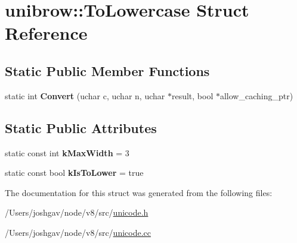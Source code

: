\hypertarget{structunibrow_1_1_to_lowercase}{}\section{unibrow\+:\+:To\+Lowercase Struct Reference}
\label{structunibrow_1_1_to_lowercase}
\subsection*{Static Public Member Functions}
\begin{DoxyCompactItemize}
\item 
static int {\bfseries Convert} (uchar c, uchar n, uchar $\ast$result, bool $\ast$allow\+\_\+caching\+\_\+ptr)\hypertarget{structunibrow_1_1_to_lowercase_a3dee260f86f4c06840bd71d2bb2f2345}{}\label{structunibrow_1_1_to_lowercase_a3dee260f86f4c06840bd71d2bb2f2345}

\end{DoxyCompactItemize}
\subsection*{Static Public Attributes}
\begin{DoxyCompactItemize}
\item 
static const int {\bfseries k\+Max\+Width} = 3\hypertarget{structunibrow_1_1_to_lowercase_a6e41e8feb6ea32c6a4737764fc948b21}{}\label{structunibrow_1_1_to_lowercase_a6e41e8feb6ea32c6a4737764fc948b21}

\item 
static const bool {\bfseries k\+Is\+To\+Lower} = true\hypertarget{structunibrow_1_1_to_lowercase_a225c76e5328e1c3bdb96438b0f751f44}{}\label{structunibrow_1_1_to_lowercase_a225c76e5328e1c3bdb96438b0f751f44}

\end{DoxyCompactItemize}


The documentation for this struct was generated from the following files\+:\begin{DoxyCompactItemize}
\item 
/\+Users/joshgav/node/v8/src/\hyperlink{unicode_8h}{unicode.\+h}\item 
/\+Users/joshgav/node/v8/src/\hyperlink{unicode_8cc}{unicode.\+cc}\end{DoxyCompactItemize}
